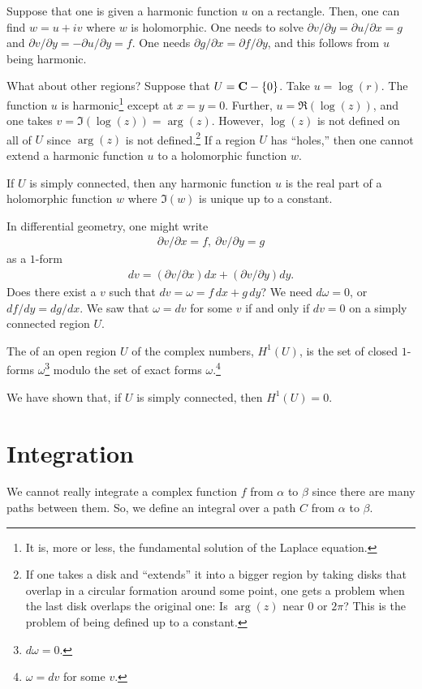 \documentclass[11pt, oneside,margin=1in]{article}
\begin{document}
Suppose that one is given a harmonic function $u$ on a rectangle. Then, one can find $w=u+iv$ where $w$ is holomorphic. One needs to solve $\partial v/\partial y =\partial u /\partial x = g$ and $\partial v/\partial y = -\partial u/\partial y = f$. One needs $\partial g/\partial x = \partial f/\partial y$, and this follows from $u$ being harmonic.

What about other regions? Suppose that $U = \mathbf C-\{0\}$. Take $u=\log (r)$. The function $u$ is harmonic\footnote{It is, more or less, the fundamental solution of the Laplace equation.} except at $x=y=0$. Further, $u = \Re (\log (z))$, and one takes $v = \Im(\log (z)) = \arg (z)$. However, $\log (z)$ is not defined on all of $U$ since $\arg (z)$ is not defined.\footnote{If one takes a disk and ``extends'' it into a bigger region by taking disks that overlap in a circular formation around some point, one gets a problem when the last disk overlaps the original one: Is $\arg (z)$ near $0$ or $2\pi$? This is the problem of being defined up to a constant.} If a region $U$ has ``holes,'' then one cannot extend a harmonic function $u$ to a holomorphic function $w$. 

If $U$ is simply connected, then any harmonic function $u$ is the real part of a holomorphic function $w$ where $\Im(w)$ is unique up to a constant.

In differential geometry, one might write
\begin{align*}
	\partial v /\partial x = f,\ \partial v / \partial y = g
\end{align*}
as a $1$-form 
\begin{align*}
	dv = (\partial v/\partial x)dx +  (\partial v/\partial y) dy.
\end{align*}
Does there exist a $v$ such that $ dv =\omega = f\,dx + g\,dy$? We need $d\omega = 0$, or $df/dy = dg/dx$. We saw that $\omega = dv$ for some $v$ if and only if $dv = 0$ on a simply connected region $U$.

\begin{definition}[ ]\label{}\text{}
The  of an open region $U$  of the complex numbers, $H^1(U)$, is the set of closed $1$-forms $\omega$\footnote{$d\omega = 0$.} modulo the set of exact forms $\omega$.\footnote{$\omega = dv$ for some $v$.}
\end{definition}

We have shown that, if $U$ is simply connected, then $H^1(U)=0$. 
\section{Integration}
We cannot really integrate a complex function $f$ from $\alpha$ to $\beta$ since there are many paths between them. So, we define an integral over a path $C$ from $\alpha$ to $\beta$.
\end{document}
